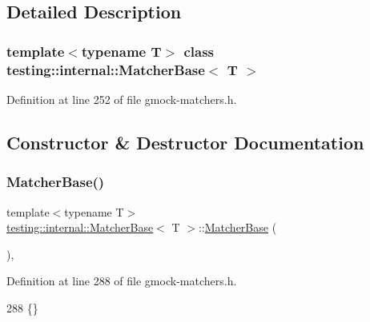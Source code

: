 \subsection{Detailed Description}
\subsubsection*{template$<$typename T$>$\newline
class testing\+::internal\+::\+Matcher\+Base$<$ T $>$}



Definition at line 252 of file gmock-\/matchers.\+h.



\subsection{Constructor \& Destructor Documentation}
\mbox{\label{classtesting_1_1internal_1_1MatcherBase_a7214ff6bbe5d13d5ee01fc09c7114e1d}} 
\subsubsection{\texorpdfstring{Matcher\+Base()}{MatcherBase()}\hspace{0.1cm}{\footnotesize\ttfamily [1/2]}}
{\footnotesize\ttfamily template$<$typename T$>$ \\
\hyperlink{classtesting_1_1internal_1_1MatcherBase}{testing\+::internal\+::\+Matcher\+Base}$<$ T $>$\+::\hyperlink{classtesting_1_1internal_1_1MatcherBase}{Matcher\+Base} (\begin{DoxyParamCaption}{ }\end{DoxyParamCaption})\hspace{0.3cm}{\ttfamily [inline]}, {\ttfamily [protected]}}



Definition at line 288 of file gmock-\/matchers.\+h.


\begin{DoxyCode}
288 \{\}
\end{DoxyCode}
\mbox{\label{classtesting_1_1internal_1_1MatcherBase_aed3e080f12ea7bde535ddf02b6f66922}} 
